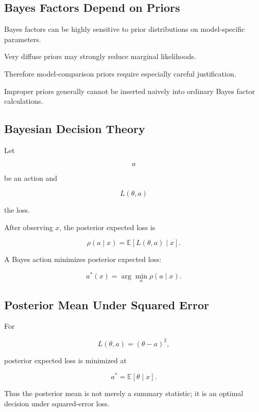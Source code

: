 \subsection{Bayes Factors Depend on Priors}
\label{subsec:bayes-factor-prior-sensitivity}

Bayes factors can be highly sensitive to prior distributions on
model-specific parameters.

Very diffuse priors may strongly reduce marginal likelihoods.

Therefore model-comparison priors require especially careful
justification.

Improper priors generally cannot be inserted naively into ordinary Bayes
factor calculations.

\subsection{Bayesian Decision Theory}
\label{subsec:bayesian-decision-theory}

Let

\[
a
\]

be an action and

\[
L(\theta,a)
\]

the loss.

After observing \(x\), the posterior expected loss is

\[
\boxed{
\rho(a\mid x)
=
\mathbb{E}
[
L(\theta,a)
\mid x
].
}
\]

A Bayes action minimizes posterior expected loss:

\[
\boxed{
a^*(x)
=
\arg\min_a
\rho(a\mid x).
}
\]

\subsection{Posterior Mean Under Squared Error}
\label{subsec:posterior-mean-squared-error}

For

\[
L(\theta,a)
=
(\theta-a)^2,
\]

posterior expected loss is minimized at

\[
\boxed{
a^*
=
\mathbb{E}[\theta\mid x].
}
\]

Thus the posterior mean is not merely a summary statistic; it is an
optimal decision under squared-error loss.

